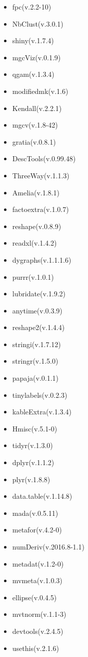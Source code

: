 \documentclass[
]{article}
\providecommand{\tightlist}{%
  \setlength{\itemsep}{0pt}\setlength{\parskip}{0pt}}
\begin{document}
\begin{itemize}
\tightlist
\item
  fpc(v.2.2-10)
\item
  NbClust(v.3.0.1)
\item
  shiny(v.1.7.4)
\item
  mgcViz(v.0.1.9)
\item
  qgam(v.1.3.4)
\item
  modifiedmk(v.1.6)
\item
  Kendall(v.2.2.1)
\item
  mgcv(v.1.8-42)
\item
  gratia(v.0.8.1)
\item
  DescTools(v.0.99.48)
\item
  ThreeWay(v.1.1.3)
\item
  Amelia(v.1.8.1)
\item
  factoextra(v.1.0.7)
\item
  reshape(v.0.8.9)
\item
  readxl(v.1.4.2)
\item
  dygraphs(v.1.1.1.6)
\item
  purrr(v.1.0.1)
\item
  lubridate(v.1.9.2)
\item
  anytime(v.0.3.9)
\item
  reshape2(v.1.4.4)
\item
  stringi(v.1.7.12)
\item
  stringr(v.1.5.0)
\item
  papaja(v.0.1.1)
\item
  tinylabels(v.0.2.3)
\item
  kableExtra(v.1.3.4)
\item
  Hmisc(v.5.1-0)
\item
  tidyr(v.1.3.0)
\item
  dplyr(v.1.1.2)
\item
  plyr(v.1.8.8)
\item
  data.table(v.1.14.8)
\item
  mada(v.0.5.11)
\item
  metafor(v.4.2-0)
\item
  numDeriv(v.2016.8-1.1)
\item
  metadat(v.1.2-0)
\item
  mvmeta(v.1.0.3)
\item
  ellipse(v.0.4.5)
\item
  mvtnorm(v.1.1-3)
\item
  devtools(v.2.4.5)
\item
  usethis(v.2.1.6)

\end{itemize}
\end{document}
